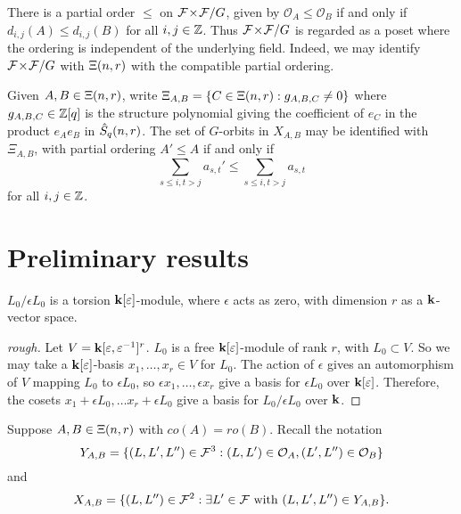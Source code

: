 \documentclass[a4paper, 11pt]{report}
\begin{document}

There is a partial order $\le$ on ${\mathcal{F}\!\times\!\mathcal{F}}/G$, given by $\mathcal{O}_A\le \mathcal{O}_B$ if and only if $d_{i,j}(A)\le d_{i,j}(B)$ for all $i,j\in\mathbb{Z}$. Thus ${\mathcal{F}\!\times\!\mathcal{F}}/G$ is regarded as a poset where the ordering is independent of the underlying field. Indeed, we may identify ${\mathcal{F}\!\times\!\mathcal{F}}/G$ with $\Xi(n,r)$ with the compatible partial ordering.

Given $A,B\in\Xi(n,r)$, write $\Xi_{A,B} = \{C\in\Xi(n,r): g_{A,B,C}\neq 0\}$ where $g_{A,B,C}\in\mathbb{Z}[q]$ is the structure polynomial giving the coefficient of $e_C$ in the product $e_A e_B$ in $\hat{S}_q(n,r)$. The set of $G$-orbits in $X_{A,B}$ may be identified with $\Xi_{A,B}$, with partial ordering $A'\le A$ if and only if
\begin{equation*}
\sum_{s\le i,t>j} a_{s,t}' \le \sum_{s\le i,t>j} a_{s,t}
\end{equation*}
for all $i,j\in\mathbb{Z}$.

\section{Preliminary results}

\begin{lemma}
$L_0/{\epsilon L_0}$ is a torsion $\mathbf{k}[\varepsilon]$-module, where $\epsilon$ acts as zero, with dimension $r$ as a $\mathbf{k}$-vector space.
\end{lemma}
\begin{proof}[rough]
Let $V = \mathbf{k}[\varepsilon,\varepsilon^{-1}]^r$. $L_0$ is a free $\mathbf{k}[\varepsilon]$-module of rank $r$, with $L_0\subset V$. So we may take a $\mathbf{k}[\varepsilon]$-basis $x_1,\ldots, x_r\in V$ for $L_0$. The action of $\epsilon$ gives an automorphism of $V$ mapping $L_0$ to $\epsilon L_0$, so $\epsilon x_1,\ldots,\epsilon x_r$ give a basis for $\epsilon L_0$ over $\mathbf{k}[\varepsilon]$. Therefore, the cosets $x_1 + \epsilon L_0,\ldots x_r +\epsilon L_0$ give a basis for $L_0/{\epsilon L_0}$ over $\mathbf{k}$.
\end{proof}

Suppose $A,B\in\Xi(n,r)$ with $co(A)=ro(B)$. Recall the notation
\begin{equation*}
Y_{A,B} = \{(L,L',L'')\in\mathcal{F}^3: (L,L')\in\mathcal{O}_A, (L',L'')\in\mathcal{O}_B\}
\end{equation*}
and
\begin{equation*}
X_{A,B} = \{(L,L'')\in\mathcal{F}^2:\exists L'\in\mathcal{F} \text{ with } (L,L',L'')\in Y_{A,B}\}.
\end{equation*}
\end{document}
